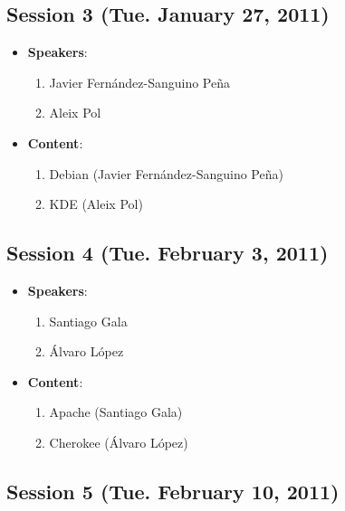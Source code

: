 \documentclass[a4paper]{article}
\begin{document}
\subsection{Session 3 (Tue. January 27, 2011)}

\begin{itemize}
 \item \textbf{Speakers}:

  \begin{enumerate}
   \item Javier Fernández-Sanguino Peña
   \item Aleix Pol
  \end{enumerate}

 \item \textbf{Content}:

  \begin{enumerate}
   \item Debian (Javier Fernández-Sanguino Peña)
   \item KDE (Aleix Pol)
  \end{enumerate}

\end{itemize}
\subsection{Session 4 (Tue. February 3, 2011)}

\begin{itemize}
 \item \textbf{Speakers}:

  \begin{enumerate}
   \item Santiago Gala
   \item Álvaro López
  \end{enumerate}

 \item \textbf{Content}:

  \begin{enumerate}
   \item Apache (Santiago Gala)
   \item Cherokee (Álvaro López)
  \end{enumerate}

\end{itemize}

\subsection{Session 5 (Tue. February 10, 2011)}
\end{document}
